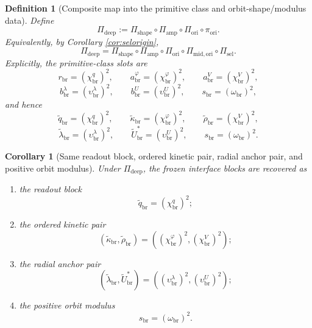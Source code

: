 \documentclass[11pt]{article}
\newcommand{\RespShapeReadout}{\widetilde q_{\mathrm{br}}}
\newcommand{\RespShapeCov}{\widetilde\kappa_{\mathrm{br}}}
\newcommand{\RespShapeRelax}{\widetilde\rho_{\mathrm{br}}}
\newcommand{\RespShapeWell}{\widetilde\lambda_{\mathrm{br}}}
\newcommand{\RespShapeEq}{\widetilde U_{\mathrm{br}}^{\ast}}
\newcommand{\ScaleMod}{s_{\mathrm{br}}}
\newcommand{\PrimRead}{r_{\mathrm{br}}}
\newcommand{\PrimCovSlot}{a_{\mathrm{br}}^{\varphi}}
\newcommand{\PrimRelaxSlot}{a_{\mathrm{br}}^{V}}
\newcommand{\PrimWellSlot}{b_{\mathrm{br}}^{\lambda}}
\newcommand{\PrimEqSlot}{b_{\mathrm{br}}^{U}}
\newcommand{\AmpMap}{\Pi_{\mathrm{amp}}}
\newcommand{\PrimMap}{\Pi_{\mathrm{shape}}}
\newcommand{\AbsReadAmp}{\chi_{\mathrm{br}}^{q}}
\newcommand{\AbsCovAmp}{\chi_{\mathrm{br}}^{\varphi}}
\newcommand{\AbsRelaxAmp}{\chi_{\mathrm{br}}^{V}}
\newcommand{\AbsWellAmp}{\upsilon_{\mathrm{br}}^{\lambda}}
\newcommand{\AbsEqAmp}{\upsilon_{\mathrm{br}}^{U}}
\newcommand{\AbsScaleAmp}{\omega_{\mathrm{br}}}
\newcommand{\OriginMap}{\Pi_{\mathrm{ori}}}
\newcommand{\DeepMap}{\Pi_{\mathrm{deep}}}
\newcommand{\MidOriginMap}{\Pi_{\mathrm{mid,ori}}}
\newcommand{\MidSelMap}{\Pi_{\mathrm{sel}}}
\newcommand{\SelProj}{\pi_{\mathrm{ori}}}
\newtheorem{definition}{Definition}
\newtheorem{corollary}{Corollary}
\begin{document}
\begin{definition}[Composite map into the primitive class and orbit-shape/modulus data]
\label{def:deepmap}
Define
\begin{equation}
\DeepMap
:=
\PrimMap\circ\AmpMap\circ\OriginMap\circ\SelProj.
\label{eq:deepmap}
\end{equation}
Equivalently, by Corollary \ref{cor:selorigin},
\[
\DeepMap
=
\PrimMap\circ\AmpMap\circ\OriginMap\circ\MidOriginMap\circ\MidSelMap.
\]
Explicitly, the primitive-class slots are
\begin{equation}
\PrimRead=(\AbsReadAmp)^{2},
\qquad
\PrimCovSlot=(\AbsCovAmp)^{2},
\qquad
\PrimRelaxSlot=(\AbsRelaxAmp)^{2},
\label{eq:selprimA}
\end{equation}
\begin{equation}
\PrimWellSlot=(\AbsWellAmp)^{2},
\qquad
\PrimEqSlot=(\AbsEqAmp)^{2},
\qquad
\ScaleMod=(\AbsScaleAmp)^{2},
\label{eq:selprimB}
\end{equation}
and hence
\begin{equation}
\RespShapeReadout=(\AbsReadAmp)^{2},
\qquad
\RespShapeCov=(\AbsCovAmp)^{2},
\qquad
\RespShapeRelax=(\AbsRelaxAmp)^{2},
\label{eq:selshapeA}
\end{equation}
\begin{equation}
\RespShapeWell=(\AbsWellAmp)^{2},
\qquad
\RespShapeEq=(\AbsEqAmp)^{2},
\qquad
\ScaleMod=(\AbsScaleAmp)^{2}.
\label{eq:selshapeB}
\end{equation}
\end{definition}

\begin{corollary}[Same readout block, ordered kinetic pair, radial anchor pair, and positive orbit modulus]
\label{cor:blockmap}
Under \(\DeepMap\), the frozen interface blocks are recovered as
\begin{enumerate}
    \item the readout block
    \[
    \RespShapeReadout=(\AbsReadAmp)^{2};
    \]
    \item the ordered kinetic pair
    \[
    (\RespShapeCov,\RespShapeRelax)=((\AbsCovAmp)^{2},(\AbsRelaxAmp)^{2});
    \]
    \item the radial anchor pair
    \[
    (\RespShapeWell,\RespShapeEq)=((\AbsWellAmp)^{2},(\AbsEqAmp)^{2});
    \]
    \item the positive orbit modulus
    \[
    \ScaleMod=(\AbsScaleAmp)^{2}.
    \]
\end{enumerate}
\end{corollary}
\end{document}
